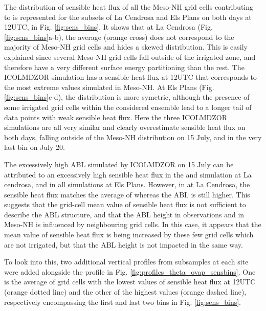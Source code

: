The distribution of sensible heat flux of all the Meso-NH grid cells contributing to \mesomean is represented for the subsets of La Cendrosa and Els Plans on both days at 12UTC, in Fig. \ref{fig:sens_bins}.
It shows that at La Cendrosa (Fig. \ref{fig:sens_bins}a-b), the average (orange cross) does not correspond to the majority of Meso-NH grid cells and hides a skewed distribution. This is easily explained since several Meso-NH grid cells fall outside of the irrigated zone, and therefore have a very different surface energy partitioning than the rest.
The ICOLMDZOR \noirr simulation has a sensible heat flux at 12UTC that corresponds to the most extreme values simulated in Meso-NH.
At Els Plans (Fig. \ref{fig:sens_bins}c-d), the distribution is more symetric, although the presence of some irrigated grid cells within the considered ensemble lead to a longer tail of data points with weak sensible heat flux.
Here the three ICOLMDZOR simulations are all very similar and clearly overestimate sensible heat flux on both days, falling outside of the Meso-NH distribution on 15 July, and in the very last bin on July 20.

The excessively high ABL simulated by ICOLMDZOR on 15 July can be attributed to an excessively high sensible heat flux in the \noirr and \irr simulation at La cendrosa, and in all simulations at Els Plans. However, in \irrboost at La Cendrosa, the sensible heat flux matches the average of \mesomean whereas the ABL is still higher. This suggests that the grid-cell mean value of sensible heat flux is not sufficient to describe the ABL structure, and that the ABL height in observations and in Meso-NH is influenced by neighbouring grid cells. In this case, it appears that the mean value of sensible heat flux is being increased by these few grid cells which are not irrigated, but that the ABL height is not impacted in the same way.

\hfill

To look into this, two additional vertical profiles from subsamples at each site were added alongside the \mesomean profile in Fig. \ref{fig:profiles_theta_ovap_sensbins}. One is the average of grid cells with the lowest values of sensible heat flux at 12UTC (orange dotted line) and the other of the highest values (orange dashed line), respectively encompassing the first and last two bins in Fig. \ref{fig:sens_bins}. 

